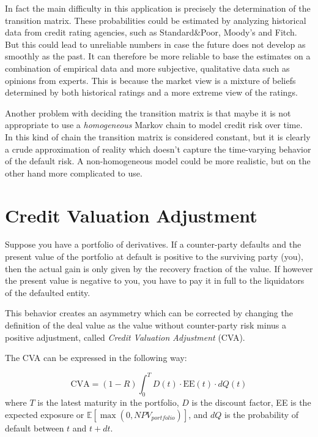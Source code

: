 In fact the main difficulty in this application is precisely the determination of the transition matrix. These probabilities could be estimated by analyzing historical data from credit rating agencies, such as Standard\&Poor, Moody's and Fitch. But this could lead to unreliable numbers in case the future does not develop as smoothly as the past. It can therefore be more reliable to base the estimates on a combination of empirical data and more subjective, qualitative data such as opinions from experts. This is because the market view is a mixture of beliefs determined by both historical ratings and a more extreme view of the ratings. 

Another problem with deciding the transition matrix is that maybe it is not appropriate to use a \emph{homogeneous} Markov chain to model credit risk over time. In this kind of chain the transition matrix is considered constant, but it is clearly a crude approximation of reality which doesn't capture the time-varying behavior of the default risk. A non-homogeneous model could be more realistic, but on the other hand more complicated to use. 

\section{Credit Valuation Adjustment}
\label{credit-valuation-adjustment}

Suppose you have a portfolio of derivatives. If a counter-party defaults and the present value of the portfolio at default is positive to the surviving party (you), then the actual gain is only given by the recovery fraction of the value. If however the present value is negative to you, you have to pay it in full to the liquidators of the defaulted entity.

This behavior creates an asymmetry which can be corrected by changing the definition of the deal value as the value without counter-party risk minus a positive adjustment, called \emph{Credit Valuation Adjustment} (CVA).

The CVA can be expressed in the following way:

\begin{equation}
\text{CVA} = (1-R) \int_0^T D(t) \cdot \textrm{EE}(t)\cdot dQ(t)
\label{eq:cva}
\end{equation}
where $T$ is the latest maturity in the portfolio, $D$ is the discount factor, EE is the expected exposure or $\mathbb{E}[\max(0, NPV_{portfolio})]$, and $dQ$ is the probability of default between $t$ and $t+dt$.

